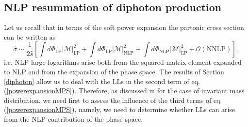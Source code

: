 \documentclass[11pt]{article}
\newcommand{\M}{\mathcal{M}}
\newcommand\eqn[1]     {eq.\,(\ref{#1})}
\begin{document}
\subsection{NLP resummation of diphoton production}
\label{resumdiphoton}

Let us recall that in terms of the soft power expansion the partonic cross section can be written as
\begin{equation}\label{powerexpansionMPS}
\hat{\sigma} \sim \frac{1}{2\hat{s}}\left[\int d\Phi_\text{LP}\left|\M\right|_\text{LP}^2+\int d\Phi_\text{LP}\left|\M\right|_\text{NLP}^2+\int d\Phi_\text{NLP}\left|\M\right|_\text{LP}^2+\mathcal{O}(\text{NNLP})\right],
\end{equation}
i.e. NLP large logarithms arise both from the squared matrix element expanded to NLP and from the expansion of the phase space. The results of Section \ref{diphoton} allow us to deal with the LLs in the second term of \eqn{powerexpansionMPS}. Therefore, as discussed in \cite{Bahjat-Abbas:2019fqa} for the case of invariant mass distribution, we need first to assess the influence of the third terms of \eqn{powerexpansionMPS}, namely, we need to determine whether LLs can arise from the NLP contribution of the phase space. 
\end{document}
